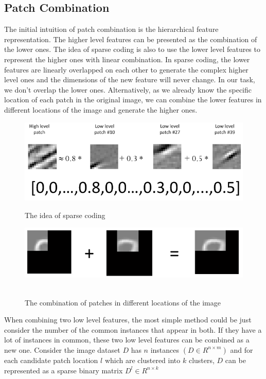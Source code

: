 \subsection{Patch Combination}
The initial intuition of patch combination is the hierarchical feature representation. The higher level features can be presented as the combination of the lower ones. The idea of sparse coding is also to use the lower level features to represent the higher ones with linear combination\cite{GrosseRKN07}. In sparse coding, the lower features are linearly overlapped on each other to generate the complex higher level ones and the dimensions of the new feature will never change. In our task,  we don't overlap the lower ones. Alternatively, as we already know the specific location of each patch in the original image, we can combine the lower features in different locations of the image and generate the higher ones.
\begin{figure}[h]
  \centering
  \includegraphics[scale = .75]{fig/sparsecoding.png}\\
  \caption{The idea of sparse coding}
\end{figure}
\begin{figure}[h]
  \centering
  \includegraphics[scale = .75]{fig/patchcombine.png}\\\
  \caption{The combination of patches in different locations of the image}
\end{figure}
When combining two low level features, the most simple method could be just consider the number of the common instances that appear in both. If they have a lot of instances in common, these two low level features can be combined as a new one. Consider the image dataset $D$ has $n$ instances $(D \in R^{n \times m})$ and for each candidate patch location $l$ which are clustered into $k$ clusters, $D$ can be represented as a sparse binary matrix $D^l \in R^{n \times k}$
